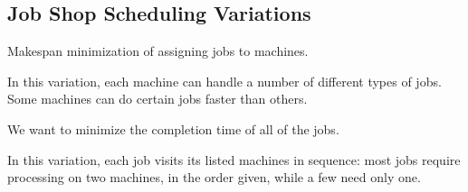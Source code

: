 \subsection{Job Shop Scheduling Variations}

Makespan minimization of assigning jobs to machines.

In this variation, each machine can handle a number of different types of jobs.  Some machines can do certain jobs faster than others. 

We want to minimize the completion time of all of the jobs.  

In this variation, each job visits its listed machines in sequence: most jobs require processing on two machines, in the order given, while a few need only one.


%
%
%
%
%
%
%
%
%
%
%
%
%
%
%
%
%
%
%
%
%
%


